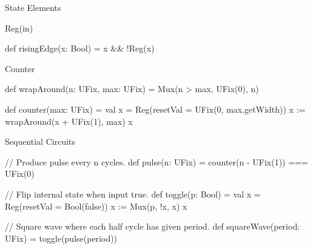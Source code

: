 \documentclass[xcolor=pdflatex,dvipsnames,table]{beamer}
\begin{document}
% 
% 

\begin{frame}[fragile]{State Elements}

\begin{scala}
Reg(in)
\end{scala}

\begin{scala}
def risingEdge(x: Bool) = x && !Reg(x)
\end{scala}

\end{frame}

\begin{frame}[fragile]{Counter}

\begin{scala}
def wrapAround(n: UFix, max: UFix) =
  Mux(n > max, UFix(0), n)

def counter(max: UFix) = {
  val x = Reg(resetVal = UFix(0, max.getWidth))
  x := wrapAround(x + UFix(1), max)
  x
}
\end{scala}

\end{frame}

\begin{frame}[fragile]{Sequential Circuits}

\begin{scala}
// Produce pulse every n cycles.
def pulse(n: UFix) = counter(n - UFix(1)) === UFix(0)
\end{scala}

\begin{scala}
// Flip internal state when input true.
def toggle(p: Bool) = {
  val x = Reg(resetVal = Bool(false))
  x := Mux(p, !x, x)
  x
}
\end{scala}

\begin{scala}
// Square wave where each half cycle has given period.
def squareWave(period: UFix) = toggle(pulse(period))
\end{scala}

\end{frame}
\end{document}

